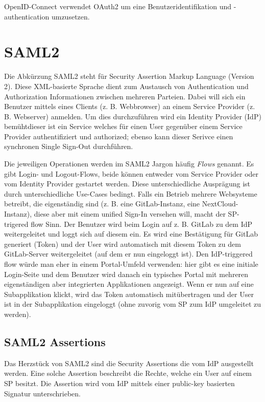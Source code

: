 OpenID-Connect verwendet OAuth2 um eine Benutzeridentifikation und -authentication umzusetzen.

\section{SAML2}

Die Abkürzung SAML2 steht für Security Assertion Markup Language (Version 2). Diese XML-basierte Sprache dient zum Austausch von Authentication und Authorization Informationen zwischen mehreren Parteien. Dabei will sich ein Benutzer mittels eines Clients (z. B. Webbrowser) an einem Service Provider (z. B. Webserver) anmelden. Um dies durchzuführen wird ein Identity Provider (IdP) bemühtdieser ist ein Service welches für einen User gegenüber einem Service Provider authentifiziert und authorized; ebenso kann dieser Serivce einen synchronen Single Sign-Out durchführen.

Die jeweiligen Operationen werden im SAML2 Jargon häufig \textit{Flows} genannt. Es gibt Login- und Logout-Flows, beide können entweder vom Service Provider oder vom Identity Provider gestartet werden. Diese unterschiedliche Ausprägung ist durch unterschiedliche Use-Cases bedingt. Falls ein Betrieb mehrere Websysteme betreibt, die eigenständig sind (z. B. eine GitLab-Instanz, eine NextCloud-Instanz), diese aber mit einem unified Sign-In versehen will, macht der SP-trigered flow Sinn. Der Benutzer wird beim Login auf z. B. GitLab zu dem IdP weitergeleitet und loggt sich auf diesem ein. Es wird eine Bestätigung für GitLab generiert (Token) und der User wird automatisch mit diesem Token zu dem GitLab-Server weitergeleitet (auf dem er nun eingeloggt ist). Den IdP-triggered flow würde man eher in einem Portal-Umfeld verwenden: hier gibt es eine initiale Login-Seite und dem Benutzer wird danach ein typisches Portal mit mehreren eigenständigen aber integrierten Applikationen angezeigt. Wenn er nun auf eine Subapplikation klickt, wird das Token automatisch mitübertragen und der User ist in der Subapplikation eingeloggt (ohne zuvorig vom SP zum IdP umgeleitet zu werden).

\subsection{SAML2 Assertions}

Das Herzstück von SAML2 sind die Security Assertions die vom IdP ausgestellt werden. Eine solche Assertion beschreibt die Rechte, welche ein User auf einem SP besitzt. Die Assertion wird vom IdP mittels einer public-key basierten Signatur unterschrieben.

